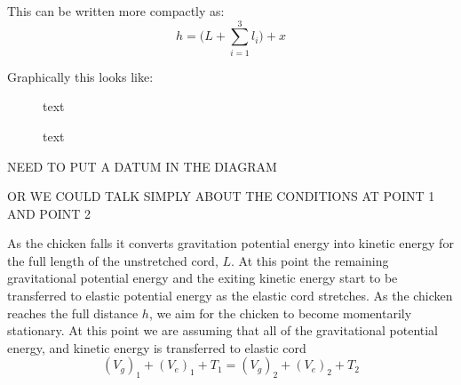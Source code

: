 \documentclass[a4paper]{article}
\begin{document}
This can be written more compactly as:
\begin{equation}
h = \bigg(L + \sum_{i=1}^{3} l_i \bigg) + x
\end{equation}

Graphically this looks like:
\begin{figure}[h]
	\centering
	\begin{minipage}[t]{0.45\textwidth}
		\centering
		\caption{text}
	\end{minipage}
	\begin{minipage}[t]{0.45\textwidth}
		\centering
		\caption{text}
	\end{minipage}
\end{figure}

NEED TO PUT A DATUM IN THE DIAGRAM

OR WE COULD TALK SIMPLY ABOUT THE CONDITIONS AT POINT 1 AND POINT 2



As the chicken falls it converts gravitation potential energy into kinetic energy for the full length of the unstretched cord, $L$. At this point the remaining gravitational potential energy and the exiting kinetic energy start to be transferred to elastic potential energy as the elastic cord stretches. As the chicken reaches the full distance $h$, we aim for the chicken to become momentarily stationary. At this point we are assuming that all of the gravitational potential energy, and kinetic energy is transferred to elastic cord
\begin{equation}
(V_g)_1 + (V_e)_1 + T_1 = (V_g)_2 + (V_e)_2 + T_2
\end{equation}
\end{document}

